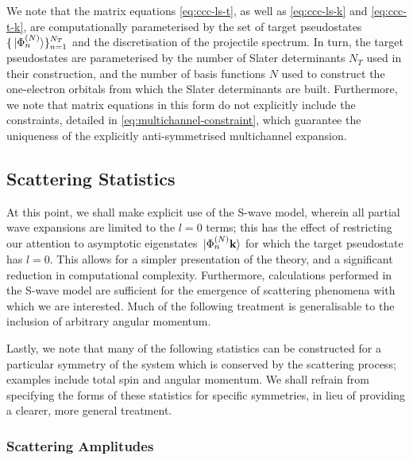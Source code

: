 \documentclass[]{article}
\begin{document}
We note that the matrix equations \eqref{eq:ccc-ls-t}, as well as
\eqref{eq:ccc-ls-k} and \eqref{eq:ccc-t-k}, are computationally
parameterised by the set of target pseudostates
$\lbrace\ket*{\Phi_{n}^{(N)}}\rbrace_{n = 1}^{N_{T}}$ and the discretisation of
the projectile spectrum.
In turn, the target pseudostates are parameterised by the number of Slater
determinants $N_{T}$ used in their construction, and the number of basis
functions $N$ used to construct the one-electron orbitals from which the Slater
determinants are built.
Furthermore, we note that matrix equations in this form do not explicitly
include the constraints, detailed in \eqref{eq:multichannel-constraint}, which
guarantee the uniqueness of the explicitly anti-symmetrised multichannel
expansion.

\subsection{Scattering Statistics}
\label{sec:th-ccc-stat}

At this point, we shall make explicit use of the S-wave model, wherein all
partial wave expansions are limited to the $l = 0$ terms;
this has the effect of restricting our attention to asymptotic eigenstates
$\ket*{\Phi_{n}^{(N)} \vb{k}}$ for which the target pseudostate has $l = 0$.
This allows for a simpler presentation of the theory, and a significant
reduction in computational complexity.
Furthermore, calculations performed in the S-wave model are sufficient for the
emergence of scattering phenomena with which we are interested.
Much of the following treatment is generalisable to the inclusion of arbitrary
angular momentum.

Lastly, we note that many of the following statistics can be constructed for a
particular symmetry of the system which is conserved by the scattering process;
examples include total spin and angular momentum.
We shall refrain from specifying the forms of these statistics for specific
symmetries, in lieu of providing a clearer, more general treatment.

\subsubsection{Scattering Amplitudes}
\label{sec:th-ccc-amp}
\end{document}

